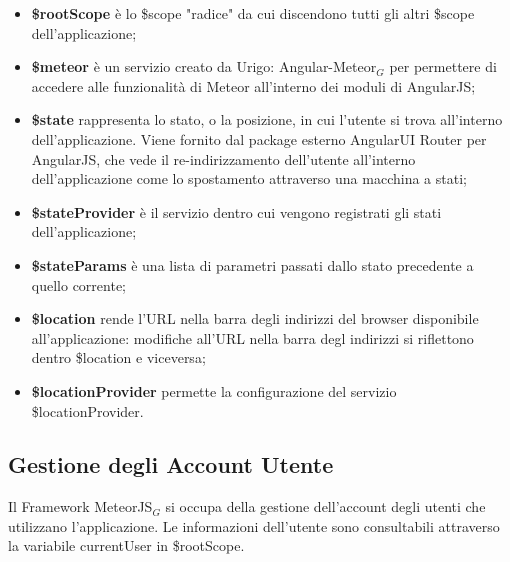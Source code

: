 \begin{itemize}
\item \textbf{\$rootScope} è lo \$scope "radice" da cui discendono tutti gli altri \$scope dell'applicazione;
\item \textbf{\$meteor} è un servizio creato da Urigo: Angular-Meteor$_G$ per permettere di accedere alle funzionalità di Meteor all'interno dei moduli di AngularJS;
\item \textbf{\$state} rappresenta lo stato, o la posizione, in cui l'utente si trova all'interno dell'applicazione. Viene fornito dal package esterno AngularUI Router per AngularJS, che vede il re-indirizzamento dell'utente all'interno dell'applicazione come lo spostamento attraverso una macchina a stati;
\item \textbf{\$stateProvider} è il servizio dentro cui vengono registrati gli stati dell'applicazione;
\item \textbf{\$stateParams} è una lista di parametri passati dallo stato precedente a quello corrente;
\item \textbf{\$location} rende l'URL nella barra degli indirizzi del browser disponibile all'applicazione: modifiche all'URL nella barra degl indirizzi si riflettono dentro \$location e viceversa;
\item \textbf{\$locationProvider} permette la configurazione del servizio \$locationProvider.

\end{itemize}

\subsection{Gestione degli Account Utente}
Il Framework MeteorJS$_G$ si occupa della gestione dell'account degli utenti che utilizzano l'applicazione. Le informazioni dell'utente sono consultabili attraverso la variabile currentUser  in \$rootScope.
